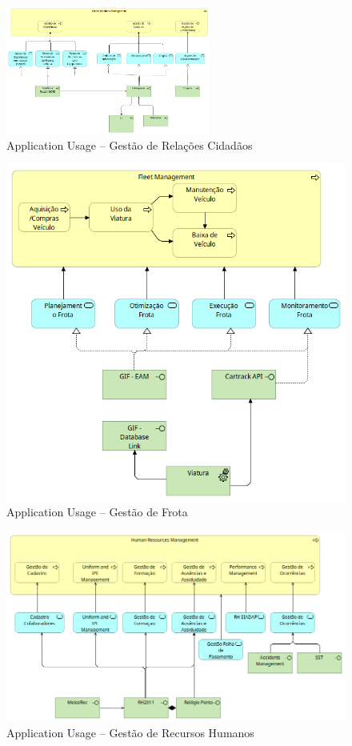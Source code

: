 \documentclass[12pt,a4paper,final]{article}
\begin{document}
    \begin{figure}[H]
        \centering
        \includegraphics[width=0.6\textwidth]{Q10_2}
        \caption{Application Usage – Gestão de Relações Cidadãos}
        \label{fig:q10_2}
    \end{figure}

    \begin{figure}[H]
        \centering
        \includegraphics[width=\textwidth]{Q10_3}
        \caption{Application Usage – Gestão de Frota}
        \label{fig:q10_3}
    \end{figure}

    \begin{figure}[H]
        \centering
        \includegraphics[width=\textwidth]{Q10_4}
        \caption{Application Usage – Gestão de Recursos Humanos}
        \label{fig:q10_4}
    \end{figure}
\end{document}
